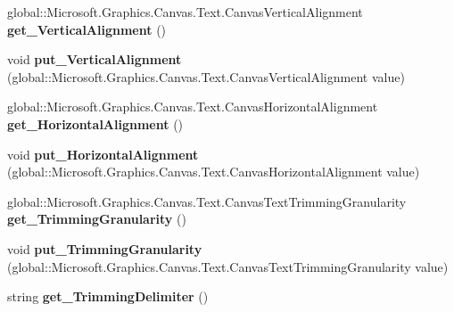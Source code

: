 \begin{DoxyCompactItemize}
global\+::\+Microsoft.\+Graphics.\+Canvas.\+Text.\+Canvas\+Vertical\+Alignment {\bfseries get\+\_\+\+Vertical\+Alignment} ()
\item 
\mbox{\label{class_microsoft_1_1_graphics_1_1_canvas_1_1_text_1_1_canvas_text_format_ad8c32a1802c2930e9a41b312f03881b1}} 
void {\bfseries put\+\_\+\+Vertical\+Alignment} (global\+::\+Microsoft.\+Graphics.\+Canvas.\+Text.\+Canvas\+Vertical\+Alignment value)
\item 
\mbox{\label{class_microsoft_1_1_graphics_1_1_canvas_1_1_text_1_1_canvas_text_format_aada5eeeefb336038b13a36fa1c2eafda}} 
global\+::\+Microsoft.\+Graphics.\+Canvas.\+Text.\+Canvas\+Horizontal\+Alignment {\bfseries get\+\_\+\+Horizontal\+Alignment} ()
\item 
\mbox{\label{class_microsoft_1_1_graphics_1_1_canvas_1_1_text_1_1_canvas_text_format_a41dba6b94d37a3688961e2aaf678a2e6}} 
void {\bfseries put\+\_\+\+Horizontal\+Alignment} (global\+::\+Microsoft.\+Graphics.\+Canvas.\+Text.\+Canvas\+Horizontal\+Alignment value)
\item 
\mbox{\label{class_microsoft_1_1_graphics_1_1_canvas_1_1_text_1_1_canvas_text_format_ae84dccbd2abc45d77d283e369c1d8033}} 
global\+::\+Microsoft.\+Graphics.\+Canvas.\+Text.\+Canvas\+Text\+Trimming\+Granularity {\bfseries get\+\_\+\+Trimming\+Granularity} ()
\item 
\mbox{\label{class_microsoft_1_1_graphics_1_1_canvas_1_1_text_1_1_canvas_text_format_acf017333af07452d3399503df70a2ad3}} 
void {\bfseries put\+\_\+\+Trimming\+Granularity} (global\+::\+Microsoft.\+Graphics.\+Canvas.\+Text.\+Canvas\+Text\+Trimming\+Granularity value)
\item 
\mbox{\label{class_microsoft_1_1_graphics_1_1_canvas_1_1_text_1_1_canvas_text_format_a51c4ffa1642d76d5d0490e546132ec41}} 
string {\bfseries get\+\_\+\+Trimming\+Delimiter} ()
\item 

\end{DoxyCompactItemize}

